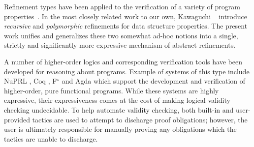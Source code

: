 Refinement types have been applied to the verification of a variety of
program properties~\cite{pfenningxi98,Dunfield,GordonTOPLAS2011,FournetCCS11}.
%
In the most closely related work to our own, Kawaguchi \etal~\cite{LiquidPLDI09} 
introduce \emph{recursive} and \emph{polymorphic} refinements for data
structure properties.
%
The present work unifies and generalizes these two somewhat ad-hoc notions 
into a single, strictly and significantly more expressive mechanism of
abstract refinements.

A number of higher-order logics and corresponding verification tools
have been developed for reasoning about programs.
%
Example of systems of this type include NuPRL \cite{Constable86},
Coq \cite{coq-book}, F$^\star$ \cite{SwamyCFSBY11} and Agda \cite{norell07}
which support the development and verification of higher-order, 
pure functional programs.
%
While these systems are highly expressive, their expressiveness comes at the
cost of making logical validity checking undecidable.
%
To help automate validity checking, both built-in and user-provided
tactics are used to attempt to discharge proof obligations; however,
the user is ultimately responsible for manually proving any
obligations which the tactics are unable to discharge.

